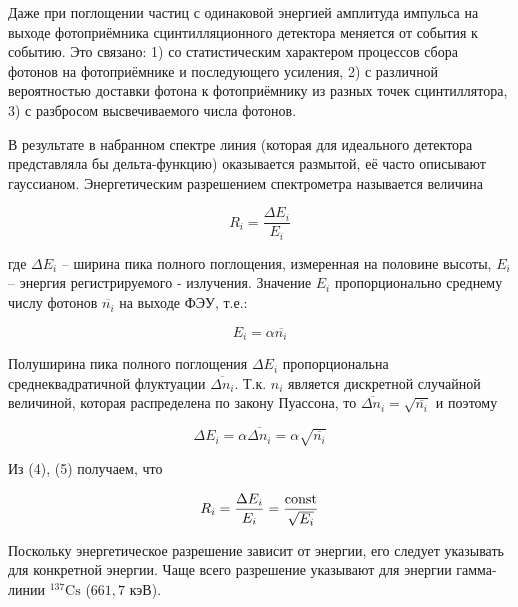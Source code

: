 Даже при поглощении частиц с одинаковой энергией амплитуда импульса на выходе
фотоприёмника сцинтилляционного детектора меняется от события к событию. Это
связано: 1) со статистическим характером процессов сбора фотонов на
фотоприёмнике и последующего усиления, 2) с различной вероятностью доставки
фотона к фотоприёмнику из разных точек сцинтиллятора, 3) с разбросом
высвечиваемого числа  фотонов.

В результате в набранном спектре линия (которая для идеального детектора
представляла бы дельта-функцию) оказывается размытой, её часто описывают
гауссианом. Энергетическим разрешением спектрометра называется величина


\begin{equation}
  R_i = \frac{\Delta E_i}{E_i}
\end{equation}

где $\Delta E_i$ – ширина пика полного поглощения, измеренная на половине
высоты, $E_i$ – энергия регистрируемого  - излучения. Значение $E_i$
пропорционально среднему числу фотонов $\overline{n_i}$ на выходе ФЭУ, т.е.:

\begin{equation}
  E_i = \alpha \overline{n_i}
\end{equation}

Полуширина пика полного поглощения $\Delta E_i$ пропорциональна
среднеквадратичной флуктуации $\overline{\Delta n_i}$. Т.к. $n_i$ является
дискретной случайной величиной, которая распределена по закону Пуассона, то
$\overline{\Delta n_i} = \sqrt{\overline{n_i}}$ и поэтому

\begin{equation}
  \Delta E_i = \alpha \overline{\Delta n_i} = \alpha \sqrt{\overline{n_i}}
\end{equation}

Из (4), (5) получаем, что

\begin{equation}
  R_i = \frac{\Delta E_i}{E_i} = \frac{\text{const}}{\sqrt{E_i}}
\end{equation}

Поскольку энергетическое разрешение зависит от энергии, его следует указывать
для конкретной энергии. Чаще всего разрешение указывают для энергии гамма-линии
${}^{137}{\text{Cs}}$ ($661,7$ кэВ).
